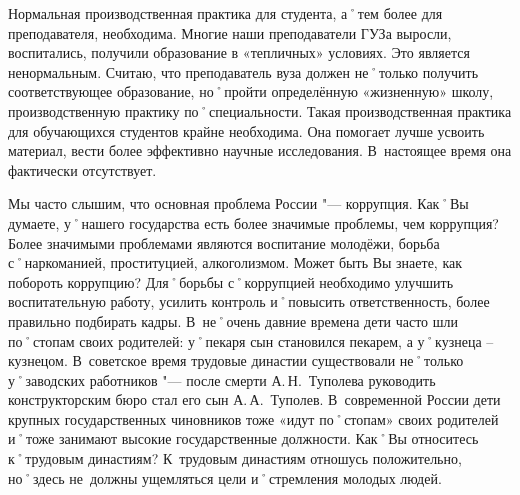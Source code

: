 \begin{drama}
	\michaelspeaks Нормальная производственная практика для студента, а˚тем более для преподавателя, необходима. Многие наши преподаватели ГУЗа выросли, воспитались, получили образование в «тепличных» условиях. Это является ненормальным. Считаю, что преподаватель вуза должен не˚только получить соответствующее образование, но˚пройти определённую «жизненную» школу, производственную практику по˚специальности. Такая производственная практика для обучающихся студентов крайне необходима. Она помогает лучше усвоить материал, вести более эффективно научные исследования. В~настоящее время она фактически отсутствует.
	
	\maxspeaks Мы часто слышим, что основная проблема России "--- коррупция. Как˚Вы думаете, у˚нашего государства есть более значимые проблемы, чем коррупция?
	\michaelspeaks Более значимыми проблемами являются воспитание молодёжи, борьба с˚наркоманией, проституцией, алкоголизмом.
	\maxspeaks Может быть Вы знаете, как побороть коррупцию? 
	\michaelspeaks Для˚борьбы с˚коррупцией необходимо улучшить воспитательную работу, усилить контроль и˚повысить ответственность, более правильно подбирать кадры.
	\maxspeaks В~не˚очень давние времена дети часто шли по˚стопам своих родителей: у˚пекаря сын становился пекарем, а у˚кузнеца – кузнецом. В~советское время трудовые династии существовали не˚только у˚заводских работников "--- после смерти А.\,Н.~Туполева руководить конструкторским бюро стал его сын А.\,А.~Туполев. В~современной России дети крупных государственных чиновников тоже «идут по˚стопам» своих родителей и˚тоже занимают высокие государственные должности. Как˚Вы относитесь к˚трудовым династиям?
	\michaelspeaks К~трудовым династиям отношусь положительно, но˚здесь не~должны ущемляться цели и˚стремления молодых людей.
	
	\pagebreak
	

\end{drama}
